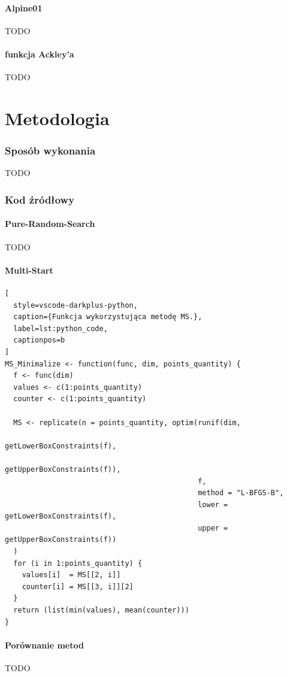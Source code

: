 \documentclass{lab}
\begin{document}
\subsection{Alpine01}
TODO

\subsection{funkcja Ackley’a}
TODO

\newpage
\part{Metodologia}
\section{Sposób wykonania}
TODO

\section{Kod źródłowy}
\subsection{Pure-Random-Search}
TODO

\subsection{Multi-Start}
\begin{lstlisting}[
  style=vscode-darkplus-python,
  caption={Funkcja wykorzystująca metodę MS.},
  label=lst:python_code,
  captionpos=b
]
MS_Minimalize <- function(func, dim, points_quantity) {
  f <- func(dim)
  values <- c(1:points_quantity)
  counter <- c(1:points_quantity) 

  MS <- replicate(n = points_quantity, optim(runif(dim, 
                                                   getLowerBoxConstraints(f), 
                                                   getUpperBoxConstraints(f)), 
                                             f, 
                                             method = "L-BFGS-B",
                                             lower = getLowerBoxConstraints(f), 
                                             upper = getUpperBoxConstraints(f))
  )
  for (i in 1:points_quantity) {
    values[i]  = MS[[2, i]]
    counter[i] = MS[[3, i]][2] 
  }
  return (list(min(values), mean(counter)))
}
\end{lstlisting}

\subsection{Porównanie metod}
TODO
\end{document}
